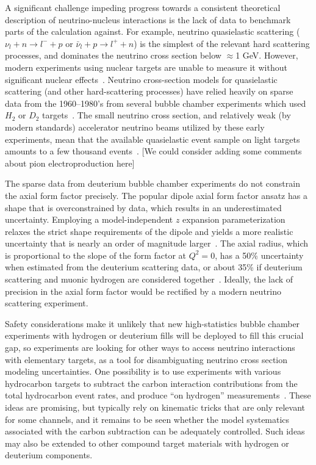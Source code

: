 A significant challenge impeding progress towards a consistent theoretical description of neutrino-nucleus interactions is the lack of data to benchmark parts of the calculation against. For example, neutrino quasielastic scattering ($\nu_{l} + n \rightarrow l^{-} + p$ or $\bar{\nu}_{l} + p \rightarrow l^{+} + n$) is the simplest of the relevant hard scattering processes, and dominates the neutrino cross section below $\approx$1 GeV. However, modern experiments using nuclear targets are unable to measure it without significant nuclear effects~\cite{garvey_review_2014, NuSTEC:2017hzk}.
Neutrino cross-section models for quasielastic scattering (and other hard-scattering processes) have relied heavily on sparse data from the 1960--1980's from several bubble chamber experiments which used $H_{2}$ or $D_2$ targets~\cite{zeller12, ParticleDataGroup:2020ssz}.
The small neutrino cross section, and relatively weak (by modern standards) accelerator neutrino beams utilized by these early experiments, mean that the available quasielastic event sample on light targets amounts to a few thousand events~\cite{ANL_Barish_1977, BNL_Baker_1981}.
{\color{red} [We could consider adding some comments about pion electroproduction here]}

The sparse data from deuterium bubble chamber experiments do not constrain
 the axial form factor precisely.
The popular dipole axial form factor ansatz has a shape that
 is overconstrained by data, which results in an underestimated uncertainty.
Employing a model-independent $z$ expansion parameterization
 relaxes the strict shape requirements of the dipole and yields
 a more realistic uncertainty that is nearly an order of magnitude larger~\cite{Meyer:2016oeg}.
The axial radius, which is proportional to the slope of the form factor at $Q^2=0$,
 has a 50\% uncertainty when estimated from the deuterium scattering data,
 or about 35\% if deuterium scattering and muonic hydrogen are considered
 together~\cite{Hill:2017wgb}.
Ideally, the lack of precision in the axial form factor would
 be rectified by a modern neutrino scattering experiment.

Safety considerations make it unlikely that new high-statistics bubble chamber experiments with
 hydrogen or deuterium fills will be deployed to fill this crucial gap,
 so experiments are looking for other ways to access neutrino interactions
 with elementary targets, as a tool for disambiguating neutrino cross section modeling uncertainties.
One possibility is to use experiments with various hydrocarbon targets to subtract the carbon interaction contributions from
 the total hydrocarbon event rates, and produce ``on hydrogen'' measurements~\cite{PhysRevD.92.051302, PhysRevD.101.092003, Hamacher-Baumann:2020ogq, DUNE:2021tad}.
 These ideas are promising, but typically rely on kinematic tricks that are only relevant for some channels, and it remains to be seen whether the model systematics associated with the carbon subtraction can be adequately controlled. Such ideas may also be extended to other compound target materials with hydrogen or deuterium components.

